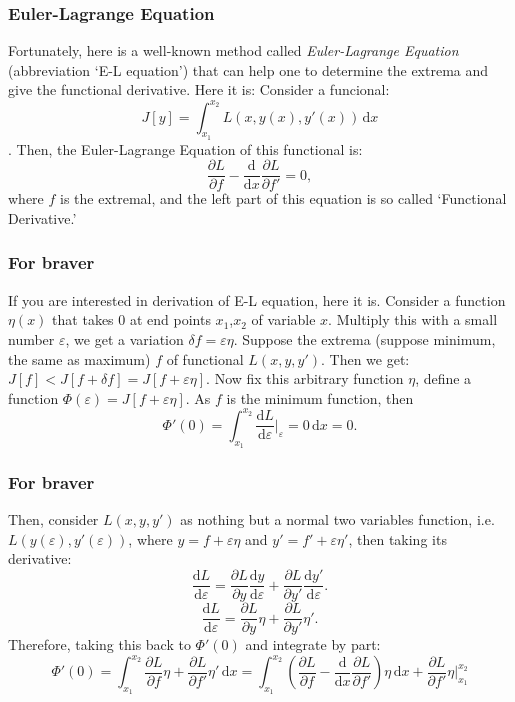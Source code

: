 \documentclass[compress]{beamer}
\begin{document}
\begin{frame}
  \frametitle{Euler-Lagrange Equation}
  Fortunately, here is a well-known method called \emph{Euler-Lagrange Equation} (abbreviation `E-L equation') that can help one to determine the extrema and give the functional derivative.
  Here it is:
  \bigbreak
  Consider a funcional: \[J\left[ y \right] = \int_{x_1}^{x_2} L(x,y(x),y'(x))\,\mathrm{d}x\].
  Then, the Euler-Lagrange Equation of this functional is:
  \[\frac{\partial L}{\partial f} - \frac{\mathrm{d}}{\mathrm{d} x}\frac{\partial L}{\partial f'}=0,\]
  where \(f\) is the extremal, and the left part of this equation is so called `Functional Derivative.'
\end{frame}

\begin{frame}
  \frametitle{For braver}
  If you are interested in derivation of E-L equation, here it is.
  \bigbreak
  Consider a function \(\eta(x)\) that takes \(0\) at end points \(x_1\),\(x_2\) of variable \(x\). Multiply this with a small number \(\varepsilon\),
  we get a variation \(\delta f = \varepsilon\eta\). Suppose the extrema (suppose minimum, the same as maximum)
  \(f\) of functional \(L(x,y,y')\). Then we get:
  \(J\left[ f \right] < J\left[ f+\delta f \right] = J\left[ f+\varepsilon\eta \right]\).
  Now fix this arbitrary function \(\eta\), define a function \(\Phi\left( \varepsilon \right) = J\left[ f+\varepsilon\eta \right].\)
  As \(f\) is the minimum function, then
  \[\Phi'\left( 0 \right) = \int_{x_1}^{x_2} \frac{\mathrm{d} L}{\mathrm{d} \varepsilon}\Big|_{\varepsilon} = 0 \,\mathrm{d}x = 0.\]

\end{frame}

\begin{frame}
  \frametitle{For braver}
  Then, consider \(L(x,y,y')\) as nothing but a normal two variables function, i.e. \(L(y(\varepsilon),y'(\varepsilon))\), where \(y = f+\varepsilon\eta\) and \(y' = f'+\varepsilon\eta'\), then taking its derivative:
  \[\frac{\mathrm{d} L}{\mathrm{d} \varepsilon} = \frac{\partial L}{\partial y}\frac{\mathrm{d} y}{\mathrm{d} \varepsilon}+\frac{\partial L}{\partial y'}\frac{\mathrm{d} y'}{\mathrm{d} \varepsilon}.\]
  \[\frac{\mathrm{d} L}{\mathrm{d} \varepsilon} = \frac{\partial L}{\partial y}\eta+\frac{\partial L}{\partial y'}\eta'.\]
  Therefore, taking this back to \(\Phi'(0)\) and integrate by part:
  \[\Phi'\left( 0 \right) = \int_{x_1}^{x_2} \frac{\partial L}{\partial f}\eta+\frac{\partial L}{\partial f'}\eta'\,\mathrm{d}x =
    \int_{x_1}^{x_2} \left( \frac{\partial L}{\partial f}-\frac{\mathrm{d} }{\mathrm{d} x}\frac{\partial L}{\partial f'} \right)\eta\,\mathrm{d}x+\frac{\partial L}{\partial f'}\eta\Big|_{x_1}^{x_2}\]
\end{frame}
\end{document}
